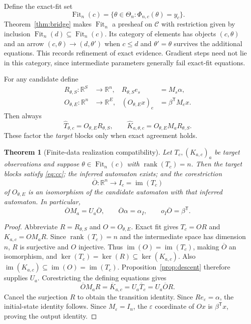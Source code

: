 \documentclass[11pt]{article}
\newtheorem{theorem}{Theorem}[section]
\theoremstyle{definition}
\newcommand{\R}{\mathbb R}
\newcommand{\im}{\operatorname{im}}
\newcommand{\rk}{\operatorname{rank}}
\newcommand{\Fit}{\operatorname{Fit}}
\begin{document}
Define the exact-fit set
\[
\Fit_n(c)=\{\theta\in\Theta_n:\Phi_{n,c}(\theta)=y_c\}.
\]
Theorem~\ref{thm:bridge} makes $\Fit_n$ a presheaf on $\mathcal C$ with
restriction given by inclusion $\Fit_n(d)\subseteq\Fit_n(c)$.
Its category of elements has objects $(c,\theta)$ and an arrow
$(c,\theta)\to(d,\theta')$ when $c\leq d$ and $\theta'=\theta$ survives the
additional equations. This records refinement of exact evidence. Gradient
steps need not lie in this category, since intermediate parameters generally
fail exact-fit equations.

For any candidate define
\begin{align*}
R_{\theta,S}:\R^S&\to\R^n,
&R_{\theta,S}e_s&=M_s\alpha,\\
O_{\theta,E}:\R^n&\to\R^E,
&(O_{\theta,E}x)_e&=\beta^{\mathsf T}M_ex.
\end{align*}
Then always
\begin{equation}\label{eq:candidatefactor}
\widehat T_{\theta,c}=O_{\theta,E}R_{\theta,S},
\qquad
\widehat K_{a,\theta,c}=O_{\theta,E}M_aR_{\theta,S}.
\end{equation}
These factor the \emph{target} blocks only when exact agreement holds.

\begin{theorem}[Finite-data realization compatibility]\label{thm:compatibility}
Let $T_c,(K_{a,c})_a$ be target observations and suppose
$\theta\in\Fit_n(c)$ with $\rk(T_c)=n$. Then the target blocks satisfy
\eqref{eq:cc}; the inferred automaton exists; and the corestriction
\[
\overline O:\R^n\longrightarrow I_c=\im(T_c)
\]
of $O_{\theta,E}$ is an isomorphism of the candidate automaton with that
inferred automaton. In particular,
\[
\overline OM_a=U_a\overline O,
\qquad \overline O\alpha=\alpha_I,
\qquad o_I\overline O=\beta^{\mathsf T}.
\]
\end{theorem}
\begin{proof}
Abbreviate $R=R_{\theta,S}$ and $O=O_{\theta,E}$. Exact fit gives
$T_c=OR$ and $K_{a,c}=OM_aR$. Since $\rk(T_c)=n$ and the intermediate space
has dimension $n$, $R$ is surjective and $O$ injective. Thus
$\im(O)=\im(T_c)$, making $\overline O$ an isomorphism, and
$\ker(T_c)=\ker(R)\subseteq\ker(K_{a,c})$. Also
$\im(K_{a,c})\subseteq\im(O)=\im(T_c)$. Proposition~\ref{prop:descent}
therefore supplies $U_a$. Corestricting the defining equations gives
\[
\overline OM_aR=\overline K_{a,c}
=U_a\overline T_c=U_a\overline OR.
\]
Cancel the surjection $R$ to obtain the transition identity. Since
$R e_\varepsilon=\alpha$, the initial-state identity follows. Since
$M_\varepsilon=I_n$, the $\varepsilon$ coordinate of $Ox$ is
$\beta^{\mathsf T}x$, proving the output identity.
\end{proof}
\end{document}
